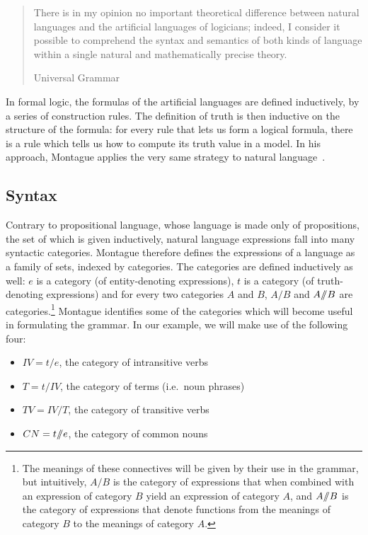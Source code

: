 \begin{quote}
  There is in my opinion no important theoretical difference between
  natural languages and the artificial languages of logicians; indeed, I
  consider it possible to comprehend the syntax and semantics of both kinds
  of language within a single natural and mathematically precise theory.

  \begin{flushright}
  Universal Grammar~\cite{montague1970universal}
  \end{flushright}
\end{quote}

In formal logic, the formulas of the artificial languages are defined
inductively, by a series of construction rules. The definition of truth is
then inductive on the structure of the formula: for every rule that lets us
form a logical formula, there is a rule which tells us how to compute its
truth value in a model. In his approach, Montague applies the very same
strategy to natural language~\cite{montague1973proper}.


\subsection{Syntax}
\label{ssec:montague-syntax}

Contrary to propositional language, whose language is made only of
propositions, the set of which is given inductively, natural language
expressions fall into many syntactic categories. Montague therefore defines
the expressions of a language as a family of sets, indexed by
categories. The categories are defined inductively as well: $e$ is a
category (of entity-denoting expressions), $t$ is a category (of
truth-denoting expressions) and for every two categories $A$ and $B$,
$A / B$ and $A /\!\!/ B$ are categories.\footnote{The meanings of
  these connectives will be given by their use in the grammar, but
  intuitively, $A / B$ is the category of expressions that when combined
  with an expression of category $B$ yield an expression of category $A$,
  and $A /\!\!/ B$ is the category of expressions that denote
  functions from the meanings of category $B$ to the meanings of category
  $A$.}  Montague identifies some of the categories which will become
useful in formulating the grammar. In our example, we will make use of the
following four:

\begin{itemize}
\item $IV = t / e$, the category of intransitive verbs
\item $T = t / IV$, the category of terms (i.e.\ noun phrases)
\item $TV = IV / T$, the category of transitive verbs
\item $CN = t /\!\!/ e$, the category of common nouns
\end{itemize}

